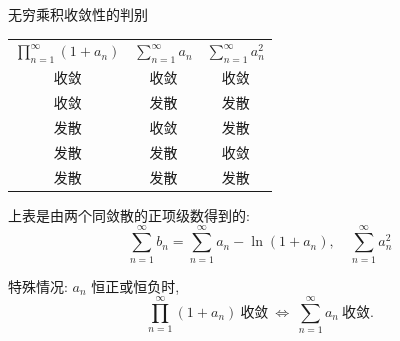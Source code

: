 \begin{frame}{无穷乘积收敛性的判别}

\begin{table}
\centering
\begin{tabular}{ccc}
$\prod\limits_{n=1}^\infty (1 + a_n)$ & $\sum\limits_{n=1}^\infty a_n$ & $\sum\limits_{n=1}^\infty a_n^2$ \\
{\color{cyan}收敛} & {\color{cyan}收敛} & {\color{cyan}收敛} \\
{\color{cyan}收敛} & {\color{red}发散} & {\color{red}发散} \\
{\color{red}发散} & {\color{cyan}收敛} & {\color{red}发散} \\
{\color{red}发散} & {\color{red}发散} & {\color{cyan}收敛} \\
{\color{red}发散} & {\color{red}发散} & {\color{red}发散}
\end{tabular}
\end{table}

\pause

上表是由两个同敛散的正项级数得到的:
\[\sum\limits_{n=1}^{\infty} b_n = \sum\limits_{n=1}^{\infty} a_n - \ln (1 + a_n), \quad \sum\limits_{n=1}^{\infty} a_n^2\]

\pause

特殊情况: $a_n$ 恒正或恒负时,
\[\prod\limits_{n=1}^\infty (1 + a_n) ~ \text{收敛} ~ \Longleftrightarrow ~ \sum\limits_{n=1}^\infty a_n ~ \text{收敛}.\]

\end{frame}


